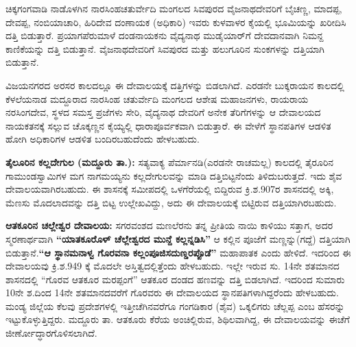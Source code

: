 ಚಿಕ್ಕಗಂಗವಾಡಿ ನಾಡೊಳಗಿನ ನಾರಸಿಂಹಚತುರ್ವೇದಿ ಮಂಗಲದ ಸಿವಪುರದ ವೈಜನಾಥದೇವರಿಗೆ ಬೈಚಣ್ಣ, ಮಾದಪ್ಪ, ದೇವಪ್ಪ, ನಂಬಿಯಾಚಾರಿ, ಹಿರಿದೇವ ದಂಣಾಯಕ (ಅಧಿಕಾರಿ) ಇವರು ಕುಳವಾಳರ ಕೈಯಲ್ಲಿ ಭೂಮಿಯನ್ನು ಖರೀದಿಸಿ ದತ್ತಿ ಬಿಡುತ್ತಾರೆ. ಪ್ರಯಾಗಪೆರುಮಾಳೆ ದಂಡನಾಯಕನು ವೈದ್ಯನಾಥ ಮುಡೈಯಾರ್​ಗೆ ದೇವದಾನವಾಗಿ ನಿಮನ್ದ ಕಾಣಿಕೆಯನ್ನು ದತ್ತಿ ಬಿಡುತ್ತಾನೆ. ವೈಜನಾಥದೇವರಿಗೆ ಸಿವಪುರದ ಮತ್ತು ಹಲುಗೂರಿನ ಸುಂಕಗಳನ್ನು ದತ್ತಿಯಾಗಿ ಬಿಡುತ್ತಾನೆ.

ವಿಜಯನಗರದ ಅರಸರ ಕಾಲದಲ್ಲೂ ಈ ದೇವಾಲಯಕ್ಕೆ ದತ್ತಿಗಳನ್ನು ಬಿಡಲಾಗಿದೆ. ಎರಡನೇ ಬುಕ್ಕರಾಯನ ಕಾಲದಲ್ಲಿ ಕೆಳಲೆಯನಾಡ ಮದ್ದೂರಾದ ನಾರಸಿಂಹ ಚತುರ್ವೇದಿ ಮಂಗಲದ ಆಶೇಷ ಮಹಾಜನಗಳು, ರಾಯರಾಯ ನರಸಿಂಗದೇವ, ಸ್ಥಳದ ಸಮಸ್ತ ಪ್ರಜೆಗಳು ಸೇರಿ, ವೈದ್ಯನಾಥ ದೇವರಿಗೆ ಅನೇಕ ತೆರಿಗೆಗಳನ್ನು ಆ ದೇವಾಲಯದ ನಾಯಕತನಕ್ಕೆ ಸಲ್ಲುವ ಚೊಕ್ಕಣ್ಣನ ಕೈಯ್ಯಲ್ಲಿ ಧಾರಾಪೂರ್ವಕವಾಗಿ ಬಿಡುತ್ತಾರೆ. ಈ ವೇಳೆಗೆ ಸ್ಥಾನಪತಿಗಳ ಆಡಳಿತ ಹೋಗಿ ಅಧಿಕಾರಿಗಳ ಆಡಳಿತ ಬಂದಿರಬಹುದೆಂದು ಹೇಳಬಹುದು.

\textbf{ತೈಲೂರಿನ ಕಲ್ಲದೇಗುಲ (ಮದ್ದೂರು ತಾ.):} ಸತ್ಯವಾಕ್ಯ ಪೆರ್ಮಾನಡಿ(ಎರಡನೇ ರಾಚಮಲ್ಲ) ಕಾಲದಲ್ಲಿ ತೈರೂರಿನ ಗಾಮುಂಡಸ್ವಾಮಿ\-ಗಳ ಮಗ ನಾಗಮಯ್ಯನು ಕಲ್ಲದೇಗುಲವನ್ನು ಮಾಡಿ ದತ್ತಿಬಿಟ್ಟನೆಂದು ತಿಳಿದುಬರುತ್ತದೆ. ಇದು ಶೈವ ದೇವಾಲಯವಾಗಿರ\-ಬಹುದು. ಈ ಶಾಸನಕ್ಕೆ ಸಮೀಪದಲ್ಲಿ ಒಳಗೆರೆಯಲ್ಲಿ ಬಿದ್ದಿರುವ ಕ್ರಿ.ಶ.907ರ ಶಾಸನದಲ್ಲಿ ಅಕ್ಕಿ, ಮೆಣಸು ಮೊದಲಾದವನ್ನು ದತ್ತಿ ಬಿಟ್ಟ ಉಲ್ಲೇಖವಿದ್ದು, ಅದು ಈ ದೇವಾಲಯಕ್ಕೆ ಬಿಟ್ಟಿರುವ ದತ್ತಿಯಾಗಿರಬಹುದು.

\textbf{ಆತಕೂರಿನ ಚಲ್ಲೇಶ್ವರ ದೇವಾಲಯ:} ಸಗರವಂಶದ ಮಣಲೆರನು ತನ್ನ ಪ್ರೀತಿಯ ನಾಯಿ ಕಾಳಿಯು ಸತ್ತಾಗ, ಅದರ ಸ್ಮರಣಾರ್ಥವಾಗಿ \textbf{“ಯಾತಕೂರೊಳ್​ ಚೆಲ್ಲೇಶ್ವರದ ಮುನ್ದೆ ಕಲ್ಲನ್ನಡಿಸಿ”} ಆ ಕಲ್ಲಿನ ಪೂಜೆಗೆ ಮಣ್ಣನ್ನು(ಗದ್ದೆ) ದತ್ತಿಯಾಗಿ ಬಿಡುತ್ತಾನೆ.\textbf{“ಆ ಸ್ಥಾನಮನಾಳ್ವ ಗೊರವನಾ ಕಲ್ಲಂಪೂಜಿಸದುಣ್ಡರಪ್ಪೊಡೆ”} ಮಹಾಪಾತಕ ಎಂದು ಹೇಳಿದೆ. ಇದರಿಂದ ಈ ದೇವಾಲಯವು ಕ್ರಿ.ಶ.949 ಕ್ಕೆ ಮೊದಲೇ ಅಸ್ತಿತ್ವದಲ್ಲಿತ್ತೆಂದು ಹೇಳಬಹುದು. ಇಲ್ಲೇ ಇರುವ ಸು. 14ನೇ ಶತಮಾನದ ಶಾಸನದಲ್ಲಿ “ಗೊರವ ಆತಕೂರ ಮರಪ್ಪಂಗೆ” ಆತಕೂರ ದಂಡದ ಹಣವನ್ನು ದತ್ತಿ ಬಿಡಲಾಗಿದೆ. ಇದರಿಂದ ಸುಮಾರು 10ನೇ ಶ.ದಿಂದ 14ನೇ ಶತಮಾನದವರೆಗೆ ಗೊರವರು ಈ ದೇವಾಲಯದ ಸ್ಥಾನಪತಿಗಳಾಗಿದ್ದರೆಂದು ಹೇಳಬಹುದು. ಮಂಡ್ಯ ಜಿಲ್ಲೆಯ ಕೆಲವು ಪ್ರದೇಶಗಳಲ್ಲಿ ಇತ್ತೀಚೆಗಿನವರೆಗೂ ಗಂಗಡಿಕಾರ (ಶೈವ) ಒಕ್ಕಲಿಗರು ಚೆಲ್ಲಪ್ಪ ಎಂಬ ಹೆಸರನ್ನು ಇಟ್ಟುಕೊಳ್ಳುತ್ತಿದ್ದರು. ಮದ್ದೂರು ತಾ. ಆತಕೂರು ಕೆರೆಯ ಅಂಚಿಲ್ಲಿರುವ, ಶಿಥಿಲವಾಗಿದ್ದ, ಈ ದೇವಾಲಯವನ್ನು ಈಚೆಗೆ ಜೀರ್ಣೋದ್ಧಾರಗೊಳಿಸಲಾಗಿದೆ.

